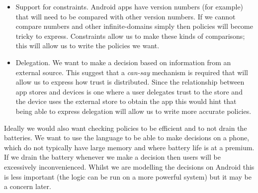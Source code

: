 \documentclass[a4paper,sfsidenotes]{%
  scrartcl%
}
\begin{document}
\begin{itemize}
  \item Support for constraints.  Android apps have version numbers (for
    example) that will need to be compared with other version numbers.  If we
    cannot compare numbers and other infinite-domains simply then policies will
    become tricky to express.  Constraints allow us to make these kinds of
    comparisons; this will allow us to write the policies we want.

  \item Delegation.  We want to make a decision based on information from an
    external source.  This suggest that a \emph{can-say} mechanism is required
    that will allow us to express how trust is distributed.   Since the
    relationship between app stores and devices is one where a user delegates
    trust to the store and the device uses the external store to obtain the app
    this would hint that being able to express delegation will allow us to write
    more accurate policies.

\end{itemize}
    
Ideally we would also want checking policies to be efficient and to not
drain the batteries.  We want to use the language to be able to make decisions
on a phone, which do not typically have large memory and where battery life is
at a premium.  If we drain the battery whenever we make a decision then users
will be excessively inconvenienced.  Whilst we are modelling the decisions on
Android this is less important (the logic can be run on a more powerful system)
but it may be a concern later.

\end{document}
